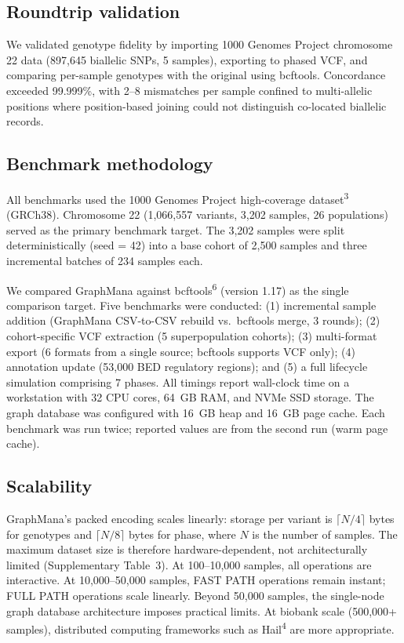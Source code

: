 \documentclass[11pt,a4paper]{article}
\newcommand{\citenum}[1]{\textsuperscript{#1}}
\begin{document}
\subsection*{Roundtrip validation}

We validated genotype fidelity by importing 1000 Genomes Project chromosome 22 data (897,645 biallelic SNPs, 5 samples), exporting to phased VCF, and comparing per-sample genotypes with the original using bcftools. Concordance exceeded 99.999\%, with 2--8 mismatches per sample confined to multi-allelic positions where position-based joining could not distinguish co-located biallelic records.

\subsection*{Benchmark methodology}

All benchmarks used the 1000 Genomes Project high-coverage dataset\citenum{3} (GRCh38). Chromosome 22 (1,066,557 variants, 3,202 samples, 26 populations) served as the primary benchmark target. The 3,202 samples were split deterministically (seed = 42) into a base cohort of 2,500 samples and three incremental batches of 234 samples each.

We compared GraphMana against bcftools\citenum{6} (version 1.17) as the single comparison target. Five benchmarks were conducted: (1) incremental sample addition (GraphMana CSV-to-CSV rebuild vs.\ bcftools merge, 3 rounds); (2) cohort-specific VCF extraction (5 superpopulation cohorts); (3) multi-format export (6 formats from a single source; bcftools supports VCF only); (4) annotation update (53,000 BED regulatory regions); and (5) a full lifecycle simulation comprising 7 phases. All timings report wall-clock time on a workstation with 32 CPU cores, 64~GB RAM, and NVMe SSD storage. The graph database was configured with 16~GB heap and 16~GB page cache. Each benchmark was run twice; reported values are from the second run (warm page cache).

\subsection*{Scalability}

GraphMana's packed encoding scales linearly: storage per variant is $\lceil N/4 \rceil$ bytes for genotypes and $\lceil N/8 \rceil$ bytes for phase, where $N$ is the number of samples. The maximum dataset size is therefore hardware-dependent, not architecturally limited (Supplementary Table~3). At 100--10,000 samples, all operations are interactive. At 10,000--50,000 samples, FAST PATH operations remain instant; FULL PATH operations scale linearly. Beyond 50,000 samples, the single-node graph database architecture imposes practical limits. At biobank scale (500,000+ samples), distributed computing frameworks such as Hail\citenum{4} are more appropriate.
\end{document}
